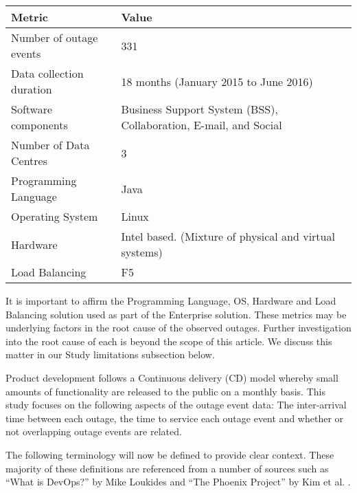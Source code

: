 \documentclass[5p]{elsarticle}
\begin{document}
\begin {table*}[]
\caption {Summary of dataset metrics} 
\begin{center}
\begin{tabular}{p{4cm} |  p{11cm}} \hline \bf{Metric} & \bf{Value}
\\ \hline Number of outage events & 331 
\\ Data collection duration & 18 months (January 2015 to June 2016) 
\\ Software components & Business Support System (BSS), Collaboration, E-mail, and Social  	
\\ Number of Data Centres & 3 
\\ Programming Language & Java 
\\ Operating System & Linux 
\\ Hardware & Intel based. (Mixture of physical and virtual systems)
\\ Load Balancing & F5
\\ \hline
\end{tabular}
\end{center}
\end{table*}

It is important to affirm the Programming Language, OS, Hardware and Load Balancing solution used as part of the Enterprise solution. These metrics may be underlying factors in the root cause of the observed outages. Further investigation into the root cause of each is beyond the scope of this article. We discuss this matter in our Study limitations subsection below.

Product development follows a Continuous delivery (CD) model whereby small amounts of functionality are released to the public on a monthly basis. This study focuses on the following aspects of the outage event data: The inter-arrival time between each outage, the time to service each outage event and whether or not overlapping outage events are related.

The following terminology will now be defined to provide clear context. These majority of these definitions are referenced from a number of sources such as ``What is DevOps?'' by Mike Loukides \cite{loukides2012devops} and ``The Phoenix Project'' by Kim et al. \cite{kim2014phoenix}.
\end{document}
